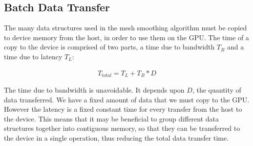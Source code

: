 \subsection*{Batch Data Transfer}
The many data structures used in the mesh smoothing algorithm must be copied to device memory from the host, in order to use them on the GPU. The time of a copy to the device is comprised of two parts, a time due to bandwidth \begin{math}T_B\end{math} and a time due to latency \begin{math}T_L\end{math}\cite{transfer2}:

\begin{align*}
T_\mathit{total} = T_L + T_B*D
\end{align*}

The time due to bandwidth is unavoidable. It depends upon \begin{math}D\end{math}, the quantity of data transferred. We have a fixed amount of data that we must copy to the GPU. However the latency is a fixed constant time for every transfer from the host to the device. This means that it may be beneficial to group different data structures together into contiguous memory, so that they can be transferred to the device in a single operation, thus reducing the total data transfer time.